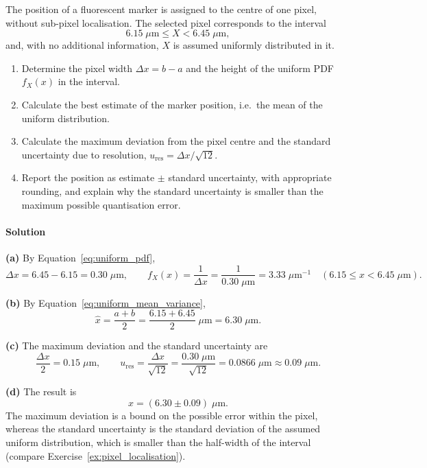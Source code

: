 The position of a fluorescent marker is assigned to the centre of one pixel, without sub-pixel localisation. The selected pixel corresponds to the interval
\begin{equation*}
6.15\;\mu\text{m} \le X < 6.45\;\mu\text{m},
\end{equation*}
and, with no additional information, $X$ is assumed uniformly distributed in it.
\begin{enumerate}[label=(\alph*)]
    \item Determine the pixel width $\Delta x = b - a$ and the height of the uniform PDF $f_X(x)$ in the interval.
    \item Calculate the best estimate of the marker position, i.e.\ the mean of the uniform distribution.
    \item Calculate the maximum deviation from the pixel centre and the standard uncertainty due to resolution, $u_{\text{res}} = \Delta x/\sqrt{12}$.
    \item Report the position as estimate $\pm$ standard uncertainty, with appropriate rounding, and explain why the standard uncertainty is smaller than the maximum possible quantisation error.
\end{enumerate}

\paragraph{Solution} \textbf{(a)} By Equation~\eqref{eq:uniform_pdf},
\begin{equation*}
\Delta x = 6.45 - 6.15 = 0.30\;\mu\text{m}, \qquad f_X(x) = \frac{1}{\Delta x} = \frac{1}{0.30\;\mu\text{m}} = 3.33\;\mu\text{m}^{-1} \quad (6.15 \le x < 6.45\;\mu\text{m}).
\end{equation*}

\textbf{(b)} By Equation~\eqref{eq:uniform_mean_variance},
\begin{equation*}
\hat{x} = \frac{a + b}{2} = \frac{6.15 + 6.45}{2}\;\mu\text{m} = 6.30\;\mu\text{m}.
\end{equation*}

\textbf{(c)} The maximum deviation and the standard uncertainty are
\begin{equation*}
\frac{\Delta x}{2} = 0.15\;\mu\text{m}, \qquad u_{\text{res}} = \frac{\Delta x}{\sqrt{12}} = \frac{0.30\;\mu\text{m}}{\sqrt{12}} = 0.0866\;\mu\text{m} \approx 0.09\;\mu\text{m}.
\end{equation*}

\textbf{(d)} The result is
\begin{equation*}
x = (6.30 \pm 0.09)\;\mu\text{m}.
\end{equation*}
The maximum deviation is a bound on the possible error within the pixel, whereas the standard uncertainty is the standard deviation of the assumed uniform distribution, which is smaller than the half-width of the interval (compare Exercise~\ref{ex:pixel_localisation}).


